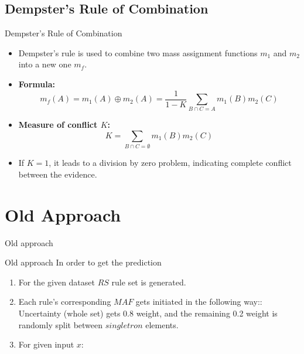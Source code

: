 \documentclass[aspectratio=169]{beamer}
\begin{document}
\subsection{Dempster's Rule of Combination}
\begin{frame}{Dempster's Rule of Combination}
\begin{itemize}
  \item Dempster's rule is used to combine two mass assignment functions \(m_1\) and \(m_2\) into a new one \(m_f\).
  \item \textbf{Formula:}
    \begin{equation*}
      m_f(A) = m_1(A) \oplus m_2(A) = \frac{1}{1 - K} \sum_{B \cap C = A} m_1(B) m_2(C)
    \end{equation*}
    \pause
  \item \textbf{Measure of conflict \(K\):}
    \begin{equation*}
      K = \sum_{B \cap C = \emptyset} m_1(B) m_2(C)
    \end{equation*}
    \pause
  \item If $K=1$, it leads to a division by zero problem, indicating complete conflict between the evidence.
  \end{itemize}
\end{frame}



\section{Old Approach}

\begin{frame}
    \begin{center}
        \Huge Old approach
    \end{center}
\end{frame}

\begin{frame}{Old approach}
    In order to get the prediction
\begin{enumerate}
    \item For the given dataset $RS$ rule set is generated.
    \item Each rule's corresponding $MAF$ gets initiated in the following way:: Uncertainty (whole set) gets 0.8 weight, and the remaining 0.2 weight is randomly split between $singletron$ elements.
    \item For given input $x$:
\end{enumerate}

\end{frame}
\end{document}
